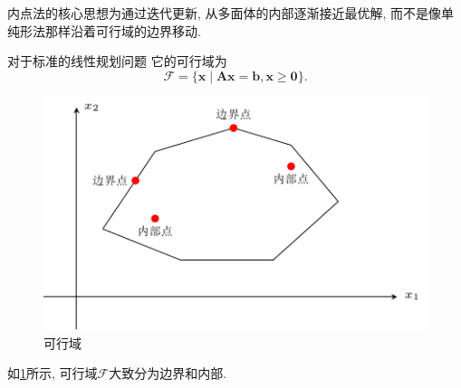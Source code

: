 内点法的核心思想为通过迭代更新, 从多面体的内部逐渐接近最优解, 而不是像单纯形法那样沿着可行域的边界移动.

对于标准的线性规划问题
它的可行域为
\begin{equation*}
    \mathcal{F}=\{\bm{x} \mid \bm{Ax}=\bm{b}, \bm{x}\geq\bm{0}\}.
\end{equation*}

\begin{figure}[ht]
    \centering
    \includegraphics[scale=1.1]{figures/17-1.pdf}
    \caption{可行域}
    \label{figure:17-1}
\end{figure}
如\cref{figure:17-1}所示, 可行域$\mathcal{F}$大致分为边界和内部.

